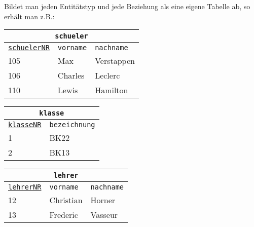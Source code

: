 Bildet man jeden Entitätstyp und jede Beziehung als eine eigene Tabelle ab, so erhält man z.B.:
\begin{minipage}{\textwidth}
	\begin{minipage}{0.5\textwidth}
		\begin{tabular}{lll}
			\multicolumn{3}{c}{\lstinline!schueler!}\\
			\hline
			\underline{\lstinline!schuelerNR!}&\lstinline!vorname!&\lstinline!nachname!\\
			\hline
			105&Max&Verstappen\\
			106&Charles&Leclerc\\
			110&Lewis&Hamilton\\
		\end{tabular}
	\end{minipage}
	\begin{minipage}{0.5\textwidth}
		\begin{tabular}{ll}
			\multicolumn{2}{c}{\lstinline!klasse!}\\
			\hline
			\underline{\lstinline!klasseNR!}&\lstinline!bezeichnung!\\
			\hline
			1&BK22\\
			2&BK13\\
		\end{tabular}
	\end{minipage}
\end{minipage}
\begin{minipage}{0.3\textwidth}
	\begin{tabular}{lll}
		\multicolumn{3}{c}{\lstinline!lehrer!}\\
		\hline
		\underline{\lstinline!lehrerNR!}&\lstinline!vorname!&\lstinline!nachname!\\
		\hline
		12&Christian&Horner\\
		13&Frederic&Vasseur\\
	\end{tabular}
\end{minipage}
